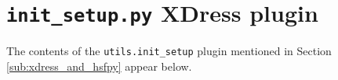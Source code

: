   \section{\texttt{init\_setup.py} XDress plugin} \label{app:initplug}

  The contents of the \texttt{utils.init\_setup} plugin mentioned in Section \ref{sub:xdress_and_hsfpy} appear below.

  \vspace{.2in}
  
  \mainstretch{}
